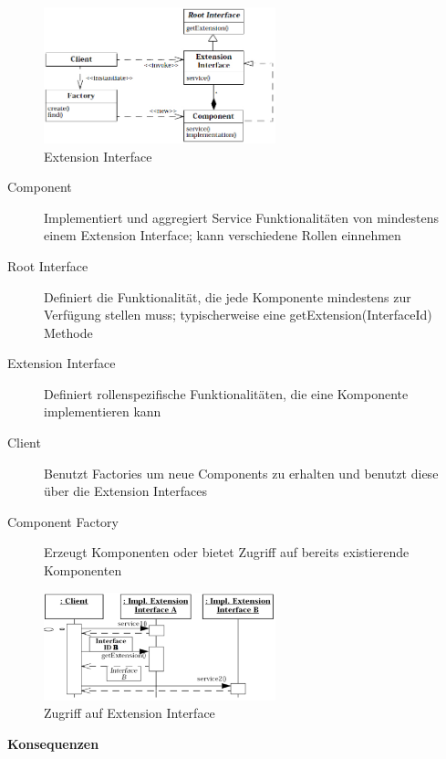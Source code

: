 \begin{figure}[H]
	\centering
	\includegraphics[width=0.6\textwidth]{content/advancedPatterns/extensioninterface.jpg}
	\caption{Extension Interface}
\end{figure}

\begin{description}
	\item[Component] Implementiert und aggregiert Service Funktionalitäten von mindestens einem Extension Interface; kann verschiedene Rollen einnehmen
	\item[Root Interface] Definiert die Funktionalität, die jede Komponente mindestens zur Verfügung stellen muss; typischerweise eine getExtension(InterfaceId) Methode
	\item[Extension Interface] Definiert rollenspezifische Funktionalitäten, die eine Komponente implementieren kann
	\item[Client] Benutzt Factories um neue Components zu erhalten und benutzt diese über die Extension Interfaces
	\item[Component Factory] Erzeugt Komponenten oder bietet Zugriff auf bereits existierende Komponenten
\end{description}

\begin{figure}[H]
	\centering
	\includegraphics[width=0.6\textwidth]{content/advancedPatterns/extensioninterfaceusage.png}
	\caption{Zugriff auf Extension Interface}
\end{figure}

\textbf{Konsequenzen}

